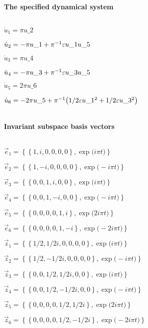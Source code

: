 \(
\)
\paragraph{The specified dynamical system}
\(
\)\par
\(\dot u_{1}=\pi  u\_2
\)\par
\(\dot u_{2}=-\pi  u\_1+\pi ^{-1} \varepsilon u\_1 u\_5
\)\par
\(\dot u_{3}=\pi  u\_4
\)\par
\(\dot u_{4}=-\pi  u\_3+\pi ^{-1} \varepsilon u\_3 u\_5
\)\par
\(\dot u_{5}=2 \pi  u\_6
\)\par
\(\dot u_{6}=-2 \pi  u\_5+\pi ^{-1} \big(1/2 \varepsilon u\_1^{2}+1/2 \varepsilon u\_3^{
2}\big)
\)\par
\(\)
\paragraph{Invariant subspace basis vectors}
\(
\)\par
\(\vec e_{1}=\left\{
\left\{
1 , i , 0 , 0 , 0 , 0
\right\} , \exp \big(i \pi  t\big)
\right\}
\)\par
\(\vec e_{2}=\left\{
\left\{
1 , -i , 0 , 0 , 0 , 0
\right\} , \exp \big(-i \pi  t\big)
\right\}
\)\par
\(\vec e_{3}=\left\{
\left\{
0 , 0 , 1 , i , 0 , 0
\right\} , \exp \big(i \pi  t\big)
\right\}
\)\par
\(\vec e_{4}=\left\{
\left\{
0 , 0 , 1 , -i , 0 , 0
\right\} , \exp \big(-i \pi  t\big)
\right\}
\)\par
\(\vec e_{5}=\left\{
\left\{
0 , 0 , 0 , 0 , 1 , i
\right\} , \exp \big(2 i \pi  t\big)
\right\}
\)\par
\(\vec e_{6}=\left\{
\left\{
0 , 0 , 0 , 0 , 1 , -i
\right\} , \exp \big(-2 i \pi  t\big)
\right\}
\)\par
\(\vec z_{1}=\left\{
\left\{
1/2 , 1/2 i , 0 , 0 , 0 , 0
\right\} , \exp \big(i \pi  t\big)
\right\}
\)\par
\(\vec z_{2}=\left\{
\left\{
1/2 , -1/2 i , 0 , 0 , 0 , 0
\right\} , \exp \big(-i \pi  t\big)
\right\}
\)\par
\(\vec z_{3}=\left\{
\left\{
0 , 0 , 1/2 , 1/2 i , 0 , 0
\right\} , \exp \big(i \pi  t\big)
\right\}
\)\par
\(\vec z_{4}=\left\{
\left\{
0 , 0 , 1/2 , -1/2 i , 0 , 0
\right\} , \exp \big(-i \pi  t\big)
\right\}
\)\par
\(\vec z_{5}=\left\{
\left\{
0 , 0 , 0 , 0 , 1/2 , 1/2 i
\right\} , \exp \big(2 i \pi  t\big)
\right\}
\)\par
\(\vec z_{6}=\left\{
\left\{
0 , 0 , 0 , 0 , 1/2 , -1/2 i
\right\} , \exp \big(-2 i \pi  t\big)
\right\}
\)\par
